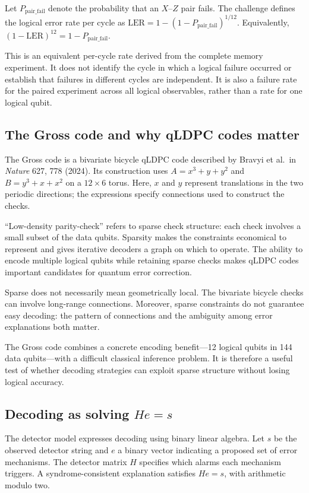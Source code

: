 Let $P_{\mathrm{pair\_fail}}$ denote the probability that an $X$--$Z$ pair fails. The challenge defines the logical error rate per cycle as
$ \mathrm{LER} = 1 - (1-P_{\mathrm{pair\_fail}})^{1/12} $.
Equivalently, $(1-\mathrm{LER})^{12}=1-P_{\mathrm{pair\_fail}}$.

This is an equivalent per-cycle rate derived from the complete memory experiment. It does not identify the cycle in which a logical failure occurred or establish that failures in different cycles are independent. It is also a failure rate for the paired experiment across all logical observables, rather than a rate for one logical qubit.

\subsection{The Gross code and why qLDPC codes matter}

The Gross code is a bivariate bicycle qLDPC code described by Bravyi et al.\ in \textit{Nature} 627, 778 (2024). Its construction uses
$A=x^3+y+y^2$ and $B=y^3+x+x^2$
on a $12 \times 6$ torus. Here, $x$ and $y$ represent translations in the two periodic directions; the expressions specify connections used to construct the checks.

``Low-density parity-check'' refers to sparse check structure: each check involves a small subset of the data qubits. Sparsity makes the constraints economical to represent and gives iterative decoders a graph on which to operate. The ability to encode multiple logical qubits while retaining sparse checks makes qLDPC codes important candidates for quantum error correction.

Sparse does not necessarily mean geometrically local. The bivariate bicycle checks can involve long-range connections. Moreover, sparse constraints do not guarantee easy decoding: the pattern of connections and the ambiguity among error explanations both matter.

The Gross code combines a concrete encoding benefit---12 logical qubits in 144 data qubits---with a difficult classical inference problem. It is therefore a useful test of whether decoding strategies can exploit sparse structure without losing logical accuracy.

\subsection{Decoding as solving $He=s$}

The detector model expresses decoding using binary linear algebra. Let $s$ be the observed detector string and $e$ a binary vector indicating a proposed set of error mechanisms. The detector matrix $H$ specifies which alarms each mechanism triggers. A syndrome-consistent explanation satisfies
$He=s$,
with arithmetic modulo two.

